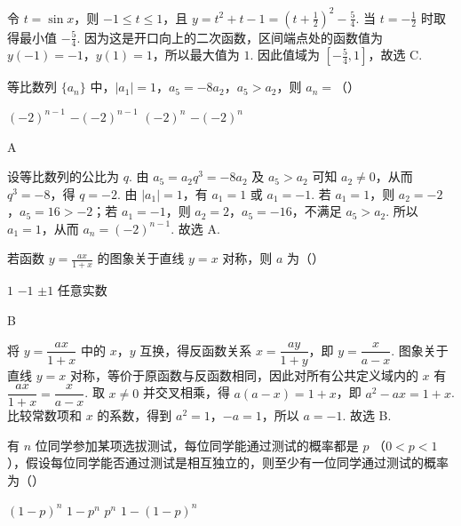 \begin{solution}
令 \(t=\sin x\)，则 \(-1\leqslant t\leqslant1\)，且 \(y=t^{2}+t-1=\left(t+\frac12\right)^{2}-\frac54\). 当 \(t=-\frac12\) 时取得最小值 \(-\frac54\). 因为这是开口向上的二次函数，区间端点处的函数值为 \(y(-1)=-1\)，\(y(1)=1\)，所以最大值为 \(1\). 因此值域为 \(\left[-\frac54,1\right]\)，故选 C.
\end{solution}

\begin{problem}
等比数列 \(\{a_{n}\}\) 中，\(|a_{1}| = 1\)，\(a_{5} = -8a_{2}\)，\(a_{5} > a_{2}\)，则 \(a_{n} =\)（\quad）

\choices
    {\((-2)^{n - 1}\)}
    {\(-(-2)^{n - 1}\)}
    {\((-2)^{n}\)}
    {\(-(-2)^{n}\)}
\end{problem}

\begin{answer}
A
\end{answer}

\begin{solution}
设等比数列的公比为 \(q\). 由 \(a_{5}=a_{2}q^{3}=-8a_{2}\) 及 \(a_{5}>a_{2}\) 可知 \(a_{2}\ne0\)，从而 \(q^{3}=-8\)，得 \(q=-2\). 由 \(\lvert a_{1}\rvert=1\)，有 \(a_{1}=1\) 或 \(a_{1}=-1\). 若 \(a_{1}=1\)，则 \(a_{2}=-2\)，\(a_{5}=16>-2\)；若 \(a_{1}=-1\)，则 \(a_{2}=2\)，\(a_{5}=-16\)，不满足 \(a_{5}>a_{2}\). 所以 \(a_{1}=1\)，从而 \(a_{n}=(-2)^{n-1}\). 故选 A.
\end{solution}

\begin{problem}
若函数 \(y = \frac{ax}{1 + x}\) 的图象关于直线 \(y = x\) 对称，则 \(a\) 为（\quad）

\choices
    {\(1\)}
    {\(-1\)}
    {\(\pm 1\)}
    {\(\text{任意实数}\)}
\end{problem}

\begin{answer}
B
\end{answer}

\begin{solution}
将 \(y=\dfrac{ax}{1+x}\) 中的 \(x\)，\(y\) 互换，得反函数关系 \(x=\dfrac{ay}{1+y}\)，即 \(y=\dfrac{x}{a-x}\). 图象关于直线 \(y=x\) 对称，等价于原函数与反函数相同，因此对所有公共定义域内的 \(x\) 有 \(\dfrac{ax}{1+x}=\dfrac{x}{a-x}\). 取 \(x\ne0\) 并交叉相乘，得 \(a(a-x)=1+x\)，即 \(a^{2}-ax=1+x\). 比较常数项和 \(x\) 的系数，得到 \(a^{2}=1\)，\(-a=1\)，所以 \(a=-1\). 故选 B.
\end{solution}

\begin{problem}
有 \(n\) 位同学参加某项选拔测试，每位同学能通过测试的概率都是 \(p\) （\(0 < p < 1\)），假设每位同学能否通过测试是相互独立的，则至少有一位同学通过测试的概率为（\quad）

\choices
    {\((1 - p)^n\)}
    {\(1 - p^n\)}
    {\(p^n\)}
    {\(1 - (1 - p)^n\)}
\end{problem}

